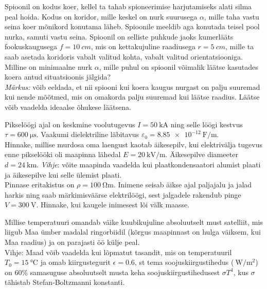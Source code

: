 \documentclass[10pt]{article}
\begin{document}

Spioonil on kodus koer, kellel ta tahab spioneerimise harjutamiseks alati silma peal hoida. Kodus on koridor, mille keskel on nurk suurusega $\alpha$, mille taha vastu seina koer mõnikord konutama läheb. Spioonile meeldib aga konutada teisel pool nurka, samuti vastu seina. Spioonil on selliste puhkude jaoks kumerlääts fookuskaugusega $f=\SI{10}{cm}$, mis on kettakujuline raadiusega $r=\SI{5}{cm}$, mille ta saab asetada koridoris vabalt valitud kohta, vabalt valitud orientatsiooniga. Milline on minimaalne nurk $\alpha$, mille puhul on spioonil võimalik läätse kasutades koera antud situatsioonis jälgida?\\
\emph{Märkus:} võib eeldada, et nii spiooni kui koera kaugus nurgast on palju suuremad kui nende mõõtmed, mis on omakorda palju suuremad kui läätse raadius. Läätse võib vaadelda ideaalse õhukese läätsena.
\probend
\bigskip


Pikselöögi ajal on keskmine voolutugevus $I=\qty{50}{\kA}$ ning selle löögi kestvus
$\tau=\qty{600}{\us}$. Vaakumi dielektriline läbitavus $\varepsilon_0=\qty{8.85e-12}{\F\per\m}$.\\
\osa Hinnake, millise murdosa oma laengust kaotab äikesepilv, kui elektrivälja tugevus enne pikselööki oli maapinna lähedal $E=\qty{20}{\kV\per\m}$.  Äikesepilve diameeter $d=\qty{24}{\km}$. \emph{Vihje}: võite maapinda vaadelda kui plaatkondensaatori alumist plaati ja äikesepilve kui selle ülemist plaati.\\
\osa Pinnase eritakistus on $\rho = \qty{100}{\ohm\m}$. Inimene seisab äikse ajal paljajalu ja jalad harkis ning saab märkimisväärse elektrilöögi, sest jalgadele rakendub pinge $V=\qty{300}{\V}$. Hinnake, kui kaugele inimesest lõi välk maasse.
\probend
\bigskip


Millise temperatuuri omandab väike kuubikujuline absoluutselt must satelliit, mis liigub Maa ümber madalal ringorbiidil (kõrgus maapinnast on hulga väiksem, kui Maa raadius) ja on parajasti öö külje peal. \\
Vihje: Maad võib vaadelda kui lõpmatut tasandit, mis on temperatuuril $T_0=\SI{15}\celsius$ ja omab kiirgustegurit $\epsilon=\num{0.6}$, st tema soojuskiirgustihedus ($\SI{}{\watt / \metre\squared}$) on 60\% samasuguse absoluutselt musta keha soojuskiirgustihedusest $\sigma T^4$, kus $\sigma$ tähistab Stefan‐Boltzmanni konstanti.
\probend
\bigskip
\end{document}

